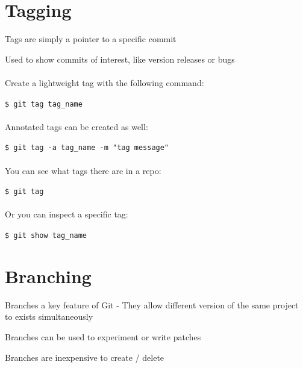 \documentclass{beamer}
\begin{document}
\section{Tagging}
\begin{frame}[allowframebreaks]{\secname}
    Tags are simply a pointer to a specific commit

    Used to show commits of interest, like version releases or bugs \\~\\

    Create a lightweight tag with the following command:

    {\tt \$ git tag tag\_name} \\~\\

    Annotated tags can be created as well: 

    {\tt \$ git tag -a tag\_name -m "tag message"} \\~\\

\framebreak
    You can see what tags there are in a repo:

    {\tt \$ git tag} \\~\\

    Or you can inspect a specific tag:

    {\tt \$ git show tag\_name}


\end{frame}

\section{Branching}
\begin{frame}{\secname}
    Branches a key feature of Git - They allow different version of the same
    project to exists simultaneously

    Branches can be used to experiment or write patches

    Branches are inexpensive to create / delete
\end{frame}
\end{document}
